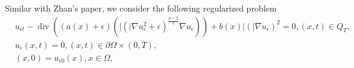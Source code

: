 \documentclass{article}
\newcommand*\abs[1]{\lvert#1\rvert}
\DeclareMathOperator{\Div}{div}
\begin{document}
    Similar with Zhan's paper, we consider the following regularized problem
    \begin{equation}
        \begin{alignedat}{1}
            & u_{\epsilon t}
            - \Div\left( \left( a(x)+\epsilon \right)\left( \abs(\nabla u_{\epsilon}^2+\epsilon)^{\frac{p-2}{2}}\nabla u_{\epsilon} \right) \right)
            + b(x)\abs(\nabla u_{\epsilon})^2 = 0, (x, t) \in Q_T,\\
            & u_{\epsilon}(x, t) = 0, (x,t) \in \partial\Omega \times (0, T),\\
            & (x, 0) = u_{\epsilon 0}(x), x \in \Omega,  
        \end{alignedat}
    \end{equation}
\end{document}
